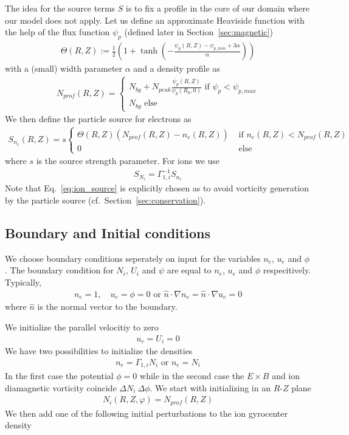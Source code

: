 The idea for the source terms $S$ is to fix a profile in the core of our domain
where our model does not apply.
Let us define an approximate Heaviside function with the help of the flux function $\psi_p$ (defined later in Section~\ref{sec:magnetic})
\begin{align}
  \Theta(R,Z) := \frac{1}{2}\left( 1 + \tanh\left( - \frac{\psi_p(R,Z) - \psi_{p,min} + 3\alpha}{\alpha} \right) \right)
  \label{eq:source_profile}
\end{align}
with a (small) width parameter $\alpha$
and a density profile as
\begin{align}
  N_{prof}(R,Z)=\begin{cases}
    N_{bg} + N_{peak}\frac{\psi_p(R,Z)} {\psi_p(R_0, 0)} \text{ if }\psi_p < \psi_{p,max} \\
    N_{bg} \text{ else }
  \end{cases}
  \label{eq:density_profile}
\end{align}
We then define the particle source for electrons as
\begin{align}
  S_{n_e}(R,Z) = s\begin{cases}
    \Theta(R,Z)(N_{prof}(R,Z) - n_e(R,Z)) &\text{ if } n_e(R,Z)<N_{prof}(R,Z)\\
    0 &\text{ else}
  \end{cases}
  \label{eq:electron_source}
\end{align}
where $s$ is the source strength parameter.
For ions we use
\begin{align}
    S_{N_i} = \Gamma_{1,i}^{-1} S_{n_e}
  \label{eq:ion_source}
\end{align}
Note that Eq.~\eqref{eq:ion_source} is explicitly chosen as to avoid vorticity generation
by the particle source (cf.~Section~\ref{sec:conservation}).

\subsection{Boundary and Initial conditions}
We choose boundary conditions seperately on input for the variables
$n_e$, $u_e$ and $\phi$. The boundary condition for $N_i$, $U_i$ and
$\psi$ are equal to $n_e$, $u_e$ and $\phi$ respecitively.
Typically,
\begin{align}
n_e = 1, \quad u_e = \phi = 0
\text{ or } \hat n \cdot \nabla n_e = \hat n \cdot \nabla u_e = 0
\end{align}
where $\hat n$ is the normal vector to the boundary.

We initialize the parallel velocitiy to zero
\begin{align}
  u_e = U_i = 0
  \label{}
\end{align}
We have two possibilities to initialize the densities
\begin{align}
  n_e = \Gamma_{1,i} N_i \text{ or } n_e = N_i
  \label{}
\end{align}
In the first case the potential $\phi= 0$ while in the second case
the $E\times B$ and ion diamagnetic vorticity coincide $\Delta N_i ~ \Delta \phi$.
We start with initializing in an $R$-$Z$ plane
\begin{align}
  N_i(R,Z,\varphi)= N_{prof}(R,Z)
  \label{}
\end{align}
We then add one of the following initial perturbations to the ion gyrocenter density

